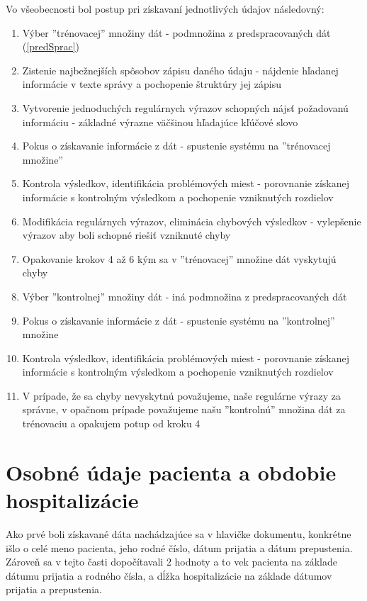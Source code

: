 Vo všeobecnosti bol postup pri získavaní jednotlivých údajov následovný:

\begin{enumerate}
	\item Výber ''trénovacej'' množiny dát - podmnožina z predspracovaných dát (\ref{predSprac})
	\item Zistenie najbežnejších spôsobov zápisu daného údaju - nájdenie hľadanej informácie v texte správy a pochopenie štruktúry jej zápisu
	\item Vytvorenie jednoduchých regulárnych výrazov schopných nájsť požadovanú informáciu - základné výrazne väčšinou hľadajúce kľúčové slovo
	\item Pokus o získavanie informácie z dát - spustenie systému na ''trénovacej množine''
	\item Kontrola výsledkov, identifikácia problémových miest - porovnanie získanej informácie s kontrolným výsledkom a pochopenie vzniknutých rozdielov
	\item Modifikácia regulárnych výrazov, eliminácia chybových výsledkov - vylepšenie výrazov aby boli schopné riešiť vzniknuté chyby
	\item Opakovanie krokov 4 až 6 kým sa v ''trénovacej'' množine dát vyskytujú chyby 
	\item Výber ''kontrolnej'' množiny dát - iná podmnožina z predspracovaných dát
	\item Pokus o získavanie informácie z dát - spustenie systému na ''kontrolnej'' množine
	\item Kontrola výsledkov, identifikácia problémových miest - porovnanie získanej informácie s kontrolným výsledkom a pochopenie vzniknutých rozdielov
	\item V prípade, že sa chyby nevyskytnú považujeme, naše regulárne výrazy za správne, v opačnom prípade považujeme našu ''kontrolnú'' množina dát za trénovaciu a opakujem potup od kroku 4 
\end{enumerate}

\section{Osobné údaje pacienta a obdobie hospitalizácie}
\label{osobUdaj}
Ako prvé boli získavané dáta nachádzajúce sa v hlavičke dokumentu, konkrétne išlo o celé meno pacienta, jeho rodné číslo, dátum prijatia a dátum prepustenia. Zároveň sa v tejto časti dopočítavali 2 hodnoty a to vek pacienta na základe dátumu prijatia a rodného čísla, a dĺžka hospitalizácie na základe dátumov prijatia a prepustenia.

